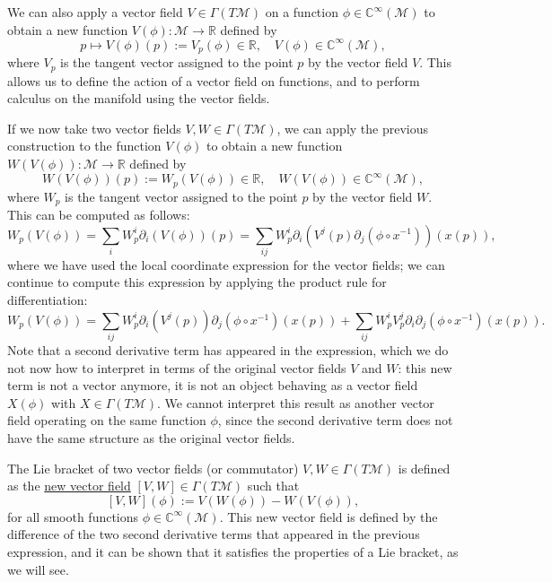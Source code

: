 We can also apply a vector field \(V \in \Gamma(T\mathcal{M})\) on a function \(\phi \in \mathbb{C}^{\infty}(\mathcal{M})\) to obtain a new function \(V(\phi) : \mathcal{M} \to \mathbb{R}\) defined by
\[
    p \mapsto V(\phi)(p) := V_p(\phi) \in \mathbb{R}, \quad V(\phi) \in \mathbb{C}^{\infty}(\mathcal{M}),
\]
where \(V_p\) is the tangent vector assigned to the point \(p\) by the vector field \(V\). This allows us to define the action of a vector field on functions, and to perform calculus on the manifold using the vector fields.

If we now take two vector fields \(V, W \in \Gamma(T\mathcal{M})\), we can apply the previous construction to the function \(V(\phi)\) to obtain a new function \(W(V(\phi)) : \mathcal{M} \to \mathbb{R}\) defined by
\[
    W(V(\phi))(p) := W_p(V(\phi)) \in \mathbb{R}, \quad W(V(\phi)) \in \mathbb{C}^{\infty}(\mathcal{M}),
\]
where \(W_p\) is the tangent vector assigned to the point \(p\) by the vector field \(W\). This can be computed as follows:
\[
    W_p(V(\phi)) = \sum_{i} W_p^i \partial_i (V(\phi))(p) = \sum_{ij} W_p^i \partial_i (V^j(p) \partial_j (\phi \circ x^{-1}))(x(p)),
\]
where we have used the local coordinate expression for the vector fields; we can continue to compute this expression by applying the product rule for differentiation:
\[
    W_p(V(\phi)) = \sum_{ij} W_p^i \partial_i (V^j(p)) \partial_j (\phi \circ x^{-1})(x(p)) + \sum_{ij} W_p^i V_p^j \partial_i \partial_j (\phi \circ x^{-1})(x(p)).
\]
Note that a second derivative term has appeared in the expression, which we do not now how to interpret in terms of the original vector fields \(V\) and \(W\): this new term is not a vector anymore, it is not an object behaving as a vector field \(X(\phi)\) with \(X \in \Gamma(T\mathcal{M})\). We cannot interpret this result as another vector field operating on the same function \(\phi\), since the second derivative term does not have the same structure as the original vector fields.

\begin{definition}
    The Lie bracket of two vector fields (or commutator) \(V, W \in \Gamma(T\mathcal{M})\) is defined as the \uline{new vector field} \([V, W] \in \Gamma(T\mathcal{M})\) such that
    \[
        [V, W](\phi) := V(W(\phi)) - W(V(\phi)),
    \]
    for all smooth functions \(\phi \in \mathbb{C}^{\infty}(\mathcal{M})\). This new vector field is defined by the difference of the two second derivative terms that appeared in the previous expression, and it can be shown that it satisfies the properties of a Lie bracket, as we will see.
\end{definition}

